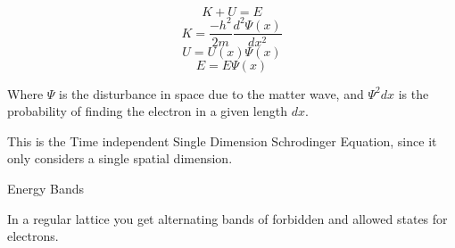 \documentclass{report}
\begin{document}
\begin{description}
\begin{mdframed}
            \begin{displaymath}
                K + U = E
            \end{displaymath}
            \begin{displaymath}
                K = \frac{-h^2}{2m} \frac{d^2 \Psi(x)}{dx^2}
            \end{displaymath}
            \begin{displaymath}
                U = U(x)\Psi(x)
            \end{displaymath}
            \begin{displaymath}
                E = E \Psi(x)
            \end{displaymath}
            
            Where $\Psi$ is the disturbance in space
            due to the matter wave, and 
             $\Psi^2 dx$ is the probability of finding
             the electron in a given length $dx$. 

             This is the Time independent Single
             Dimension Schrodinger Equation, since
             it only considers a single spatial
             dimension.
        \end{mdframed}
    \item {\large Energy Bands}
        \begin{mdframed}
            In a regular lattice you get alternating
            bands of forbidden and allowed states
            for electrons.
            


\end{mdframed}
\end{description}
\end{document}
